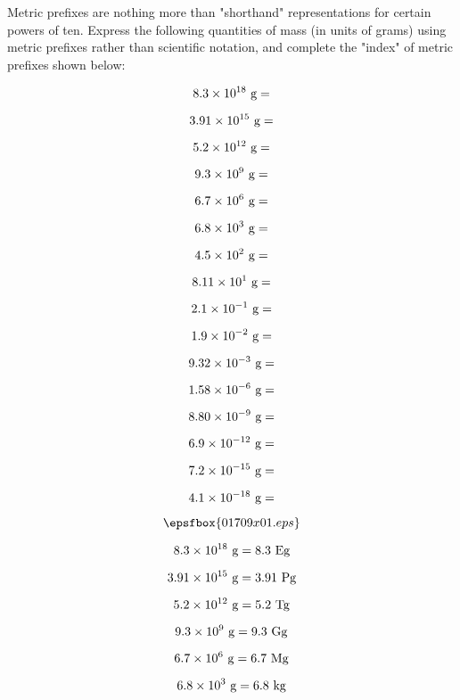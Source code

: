 

Metric prefixes are nothing more than "shorthand" representations for certain powers of ten.  Express the following quantities of mass (in units of grams) using metric prefixes rather than scientific notation, and complete the "index" of metric prefixes shown below:

$$8.3 \times 10^{18} \hbox{ g} = $$

$$3.91 \times 10^{15} \hbox{ g} = $$

$$5.2 \times 10^{12} \hbox{ g} = $$

$$9.3 \times 10^9 \hbox{ g} = $$

$$6.7 \times 10^6 \hbox{ g} = $$

$$6.8 \times 10^3 \hbox{ g} = $$

$$4.5 \times 10^2 \hbox{ g} = $$

$$8.11 \times 10^1 \hbox{ g} = $$

$$2.1 \times 10^{-1} \hbox{ g} = $$

$$1.9 \times 10^{-2} \hbox{ g} = $$

$$9.32 \times 10^{-3} \hbox{ g} = $$

$$1.58 \times 10^{-6} \hbox{ g} = $$

$$8.80 \times 10^{-9} \hbox{ g} = $$

$$6.9 \times 10^{-12} \hbox{ g} = $$

$$7.2 \times 10^{-15} \hbox{ g} = $$

$$4.1 \times 10^{-18} \hbox{ g} = $$

$$\epsfbox{01709x01.eps}$$







$$8.3 \times 10^{18} \hbox{ g} = 8.3 \hbox{ Eg}$$

$$3.91 \times 10^{15} \hbox{ g} = 3.91 \hbox{ Pg}$$

$$5.2 \times 10^{12} \hbox{ g} = 5.2 \hbox{ Tg}$$

$$9.3 \times 10^9 \hbox{ g} = 9.3 \hbox{ Gg}$$

$$6.7 \times 10^6 \hbox{ g} = 6.7 \hbox{ Mg}$$

$$6.8 \times 10^3 \hbox{ g} = 6.8 \hbox{ kg}$$

